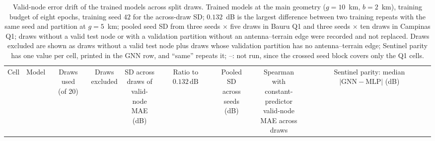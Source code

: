 \begin{table}[H]
\caption{Valid-node error drift of the trained models across split draws. Trained models at the main geometry ($g = 10$~km, $b = 2$~km), training budget of eight epochs, training seed $42$ for the across-draw SD; $0.132$~dB is the largest difference between two training repeats with the same seed and partition at $g = 5$~km; pooled seed SD from three seeds $\times$ five draws in Bauru Q1 and three seeds $\times$ ten draws in Campinas Q1; draws without a valid test node or with a validation partition without an antenna--terrain edge were recorded and not replaced. Draws excluded are shown as draws without a valid test node plus draws whose validation partition has no antenna--terrain edge; Sentinel parity has one value per cell, printed in the GNN row, and ``same'' repeats it; --: not run, since the crossed seed block covers only the Q1 cells.}
\label{tab:drift_models_g10}
\centering
\begin{tabular}{llccccccc}
\toprule
Cell & Model & \celula{Draws used \\ \relax (of 20)} & \celula{Draws \\ \relax excluded} & \celula{SD across \\ \relax draws of \\ \relax valid-node \\ \relax MAE (dB)} & \celula{Ratio to \\ \relax $0.132\,\mathrm{dB}$} & \celula{Pooled SD \\ \relax across \\ \relax seeds (dB)} & \celula{Spearman \\ \relax with \\ \relax constant-predictor \\ \relax valid-node \\ \relax MAE across \\ \relax draws} & \celula{Sentinel \\ \relax parity: \\ \relax median \\ \relax $|\mathrm{GNN}-\mathrm{MLP}|$ \\ \relax (dB)} \\

\end{tabular}
\end{table}
